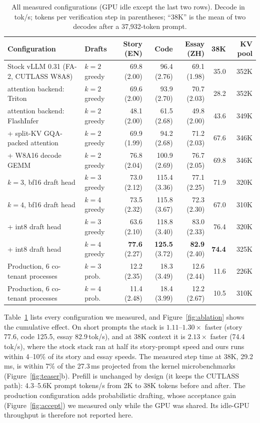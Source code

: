 \documentclass[acmtog,nonacm,screen]{acmart}
\newcommand{\tps}{\,tok/s\xspace}
\newcommand{\ms}{\,ms\xspace}
\begin{document}
\begin{table}[t]
\caption{All measured configurations (GPU idle except the last two rows). Decode in \tps; tokens per verification step
in parentheses; ``38K'' is the mean of two decodes after a 37{,}932-token prompt.}
\label{tab:configs}
\small
\begin{tabular}{@{}llrrrrr@{}}
\toprule
Configuration & Drafts & Story (EN) & Code & Essay (ZH) & 38K & KV pool \\
\midrule
Stock vLLM 0.31 (FA-2, CUTLASS W8A8)        & $k{=}2$ greedy & 69.8 (2.00) & 96.4 (2.76)  & 69.1 (1.98) & 35.0 & 352K \\
\quad attention backend: Triton               & $k{=}2$ greedy & 69.6 (2.00) & 93.9 (2.70)  & 70.7 (2.03) & 28.2 & 352K \\
\quad attention backend: FlashInfer           & $k{=}2$ greedy & 48.1 (2.00) & 61.5 (2.68)  & 49.8 (2.00) & 43.6 & 349K \\
+ split-KV GQA-packed attention               & $k{=}2$ greedy & 69.9 (1.99) & 94.2 (2.68)  & 71.2 (2.03) & 67.6 & 346K \\
+ W8A16 decode GEMM                           & $k{=}2$ greedy & 76.8 (2.04) & 100.9 (2.69) & 76.7 (2.05) & 69.8 & 346K \\
\quad $k{=}3$, bf16 draft head                & $k{=}3$ greedy & 73.0 (2.12) & 115.4 (3.36) & 77.1 (2.25) & 71.9 & 320K \\
\quad $k{=}4$, bf16 draft head                & $k{=}4$ greedy & 73.5 (2.32) & 115.8 (3.67) & 72.3 (2.30) & 67.0 & 310K \\
+ int8 draft head                             & $k{=}3$ greedy & 63.6 (2.10) & 118.8 (3.40) & 83.0 (2.33) & 76.4 & 320K \\
+ int8 draft head                             & $k{=}4$ greedy & \textbf{77.6} (2.27) & \textbf{125.5} (3.72) & \textbf{82.9} (2.40) & \textbf{74.4} & 325K \\
\midrule
Production, 6 co-tenant processes             & $k{=}3$ prob.  & 12.2 (2.35) & 18.3 (3.49) & 12.6 (2.44) & 11.6 & 226K \\
Production, 6 co-tenant processes             & $k{=}4$ prob.  & 11.4 (2.48) & 18.4 (3.99) & 12.2 (2.67) & 10.5 & 310K \\
\bottomrule
\end{tabular}
\end{table}

Table~\ref{tab:configs} lists every configuration we measured, and Figure~\ref{fig:ablation} shows the cumulative
effect. On short prompts the stack is $1.11$--$1.30\times$ faster (story 77.6, code 125.5, essay 82.9\tps), and at 38K
context it is $2.13\times$ faster (74.4\tps), where the stock stack ran at half its story-prompt speed and ours runs within 4--10\%
of its story and essay speeds. The measured step time at 38K, 29.2\ms, is within 7\% of the 27.3\ms projected from the kernel
microbenchmarks (Figure~\ref{fig:teaser}b). Prefill is unchanged by design (it keeps the CUTLASS path): 4.3--5.6K
prompt tokens/s from 2K to 38K tokens before and after. The production configuration adds probabilistic drafting,
whose acceptance gain (Figure~\ref{fig:accept}) we measured only while the GPU was shared. Its idle-GPU throughput is
therefore not reported here.
\end{document}
